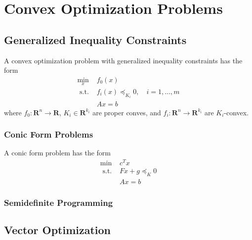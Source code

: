 \chapter{Convex Optimization Problems}

\section{Generalized Inequality Constraints}

\begin{definition}
    A convex optimization problem with generalized inequality constraints has the form
    \begin{equation}
        \begin{array}{ll}
            \min_x        & f_{0}(x)                                    \\
            \text{ s.t. } & f_{i}(x)\preceq_{K_{i}}0,\quad i=1,\ldots,m \\
                          & Ax=b
        \end{array}
    \end{equation}
    where $f_{0}:\mathbf{R}^n\rightarrow\mathbf{R}$, $K_i\in\mathbf{R}^{k_i}$ are proper conves, and $f_i:\mathbf{R}^n\rightarrow\mathbf{R}^{k_i}$ are $K_i$-convex.
\end{definition}

\subsection{Conic Form Problems}

\begin{definition}
    A conic form problem has the form
    \begin{equation}
        \begin{array}{ll}
            \min          & c^{T}x           \\
            \text{ s.t. } & Fx+g\preceq_{K}0 \\
                          & Ax=b
        \end{array}
    \end{equation}
\end{definition}

\subsection{Semidefinite Programming}

\section{Vector Optimization}